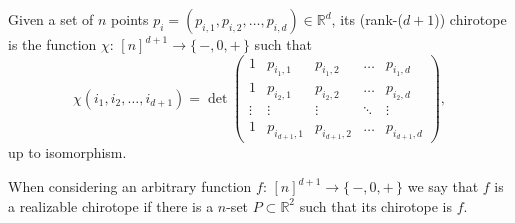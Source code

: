 \begin{definition}[%
	name={Chirotope of a Point Set in \(\mathbb{R}^d\)},
	label=definition:chirotope%
]
	Given a set of
	\(n\) points \(p_i = (p_{i,1},p_{i,2}, \ldots, p_{i,d}) \in \mathbb{R}^d\),
	its (rank-(\(d+1\))) chirotope is the function \(\chi \colon\,
	{[n]}^{d+1} \to \{\, - , 0 , +\,\}\) such that
	\begin{displaymath}
		\chi(i_1, i_2, \ldots, i_{d+1}) =
		\det
		\left(
		\begin{matrix}
			1 & p_{i_1,1} & p_{i_1,2} & \hdots & p_{i_1,d} \\
			1 & p_{i_2,1} & p_{i_2,2} & \hdots & p_{i_2,d} \\
			\vdots & \vdots & \vdots & \ddots & \vdots \\
			1 & p_{i_{d+1},1} & p_{i_{d+1},2} & \hdots & p_{i_{d+1},d}
		\end{matrix}
		\right),
	\end{displaymath}
	up to isomorphism.
\end{definition}
%
\begin{definition}[name={Realizable Chirotope},label={def:realizable-chirotope}]
When considering an arbitrary function \(f \colon\, {[n]}^{d+1} \to \{\, -, 0,
+\,\}\) we say that \(f\) is a realizable chirotope if there is a
\(n\)-set \(P \subset \mathbb{R}^2\)
such that its chirotope is \(f\).
\end{definition}
